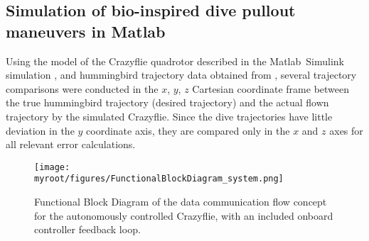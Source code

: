 \documentclass[onecolumn,10pt]{IEEEtran}
\newcommand{\myroot}{../}
\newcommand{\MATLAB}{Matlab}
\newcommand{\Matlab}{Matlab}
\begin{document}
\subsection{Simulation of bio-inspired dive pullout maneuvers in \Matlab}

Using the model of the Crazyflie quadrotor described in the 
\MATLAB\ Simulink simulation \cite{hartman2014quadcopter},
and hummingbird trajectory data obtained from \cite{clark2009courtship}, several trajectory comparisons were conducted in the $x$, $y$, $z$ Cartesian coordinate frame between the true hummingbird trajectory (desired trajectory) and the actual flown trajectory by the simulated Crazyflie. Since the dive trajectories have little deviation in the $y$ coordinate axis, they are compared only in the $x$ and $z$ axes for all relevant error calculations. 

\begin{figure}
\begin{center}
\texttt{[image: \\myroot/figures/FunctionalBlockDiagram\_system.png]}
\end{center}
\caption{Functional Block Diagram of the data communication flow concept for the autonomously controlled Crazyflie, with an included onboard controller feedback loop.}
\label{fig:demonstration-2}
\end{figure}
\end{document}
